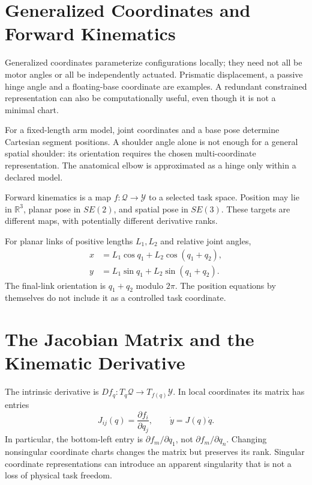 \section{Generalized Coordinates and Forward Kinematics}
\label{sec:generalized}
\label{def:forward_kinematics}
\label{def:generalized_coordinates}

Generalized coordinates parameterize configurations locally; they need not all be motor angles or all be independently actuated. Prismatic displacement, a passive hinge angle and a floating-base coordinate are examples. A redundant constrained representation can also be computationally useful, even though it is not a minimal chart.

For a fixed-length arm model, joint coordinates and a base pose determine Cartesian segment positions. A shoulder angle alone is not enough for a general spatial shoulder: its orientation requires the chosen multi-coordinate representation. The anatomical elbow is approximated as a hinge only within a declared model.

Forward kinematics is a map $f:\mathcal Q\to\mathcal Y$ to a selected task space. Position may lie in $\mathbb R^3$, planar pose in $SE(2)$, and spatial pose in $SE(3)$. These targets are different maps, with potentially different derivative ranks.

For planar links of positive lengths $L_1,L_2$ and relative joint angles,
\begin{equation}
 \begin{aligned}
 x&=L_1\cos q_1+L_2\cos(q_1+q_2),\\
 y&=L_1\sin q_1+L_2\sin(q_1+q_2).
 \end{aligned}
\end{equation}
The final-link orientation is $q_1+q_2$ modulo $2\pi$. The position equations by themselves do not include it as a controlled task coordinate.

\section{The Jacobian Matrix and the Kinematic Derivative}
\label{sec:jacobian}
\label{def:jacobian_kin}

The intrinsic derivative is $Df_q:T_q\mathcal Q\to T_{f(q)}\mathcal Y$. In local coordinates its matrix has entries
\begin{equation}
 J_{ij}(q)=\frac{\partial f_i}{\partial q_j},\qquad
 \dot y=J(q)\dot q.
\end{equation}
In particular, the bottom-left entry is $\partial f_m/\partial q_1$, not $\partial f_m/\partial q_n$. Changing nonsingular coordinate charts changes the matrix but preserves its rank. Singular coordinate representations can introduce an apparent singularity that is not a loss of physical task freedom.

